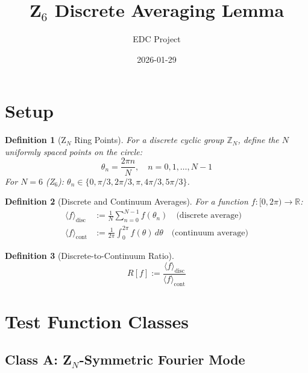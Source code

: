 \documentclass[11pt]{article}
\title{Z$_6$ Discrete Averaging Lemma}
\author{EDC Project}
\date{2026-01-29}
\newtheorem{definition}{Definition}
\begin{document}
\maketitle

\section{Setup}

\begin{definition}[Z$_N$ Ring Points]
\label{def:zn-points}
For a discrete cyclic group $\mathbb{Z}_N$, define the $N$ uniformly spaced points on the circle:
\begin{equation}
\theta_n = \frac{2\pi n}{N}, \quad n = 0, 1, \ldots, N-1
\end{equation}
For $N = 6$ (Z$_6$): $\theta_n \in \{0, \pi/3, 2\pi/3, \pi, 4\pi/3, 5\pi/3\}$.
\end{definition}

\begin{definition}[Discrete and Continuum Averages]
\label{def:averages}
For a function $f: [0, 2\pi) \to \mathbb{R}$:
\begin{align}
\langle f \rangle_{\text{disc}} &:= \frac{1}{N} \sum_{n=0}^{N-1} f(\theta_n) \quad \text{(discrete average)} \\
\langle f \rangle_{\text{cont}} &:= \frac{1}{2\pi} \int_0^{2\pi} f(\theta)\, d\theta \quad \text{(continuum average)}
\end{align}
\end{definition}

\begin{definition}[Discrete-to-Continuum Ratio]
\label{def:ratio}
\begin{equation}
R[f] := \frac{\langle f \rangle_{\text{disc}}}{\langle f \rangle_{\text{cont}}}
\end{equation}
\end{definition}

\section{Test Function Classes}

\subsection{Class A: Z$_N$-Symmetric Fourier Mode}
\end{document}
